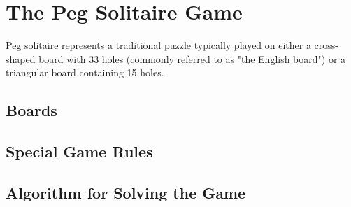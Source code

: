 \section{The Peg Solitaire Game}
\label{sec:peg-solitaire-game}

Peg solitaire represents a traditional puzzle typically played on either a cross-shaped board with 33 holes (commonly referred to as "the English board") or a triangular board containing 15 holes.\cite{Bell_2006}

\subsection{Boards}

\subsection{Special Game Rules}

\subsection{Algorithm for Solving the Game}
